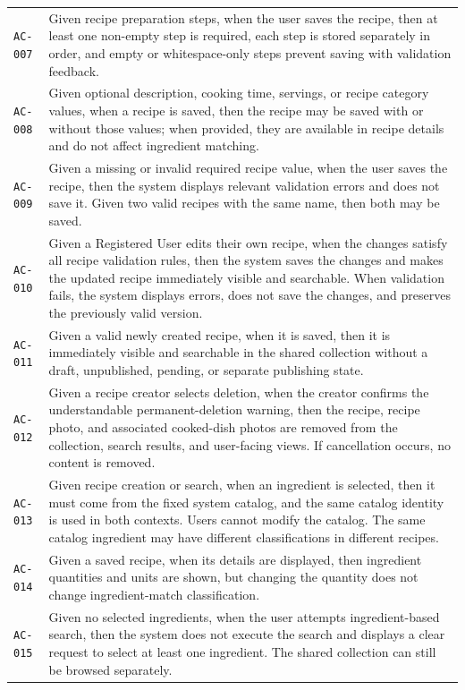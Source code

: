\documentclass[12pt]{article}
\begin{document}
\begin{longtable}{p{} p{}}
\texttt{AC-007} & Given recipe preparation steps, when the user saves the recipe, then at least one non-empty step is required, each step is stored separately in order, and empty or whitespace-only steps prevent saving with validation feedback. \\
\texttt{AC-008} & Given optional description, cooking time, servings, or recipe category values, when a recipe is saved, then the recipe may be saved with or without those values; when provided, they are available in recipe details and do not affect ingredient matching. \\
\texttt{AC-009} & Given a missing or invalid required recipe value, when the user saves the recipe, then the system displays relevant validation errors and does not save it. Given two valid recipes with the same name, then both may be saved. \\
\texttt{AC-010} & Given a Registered User edits their own recipe, when the changes satisfy all recipe validation rules, then the system saves the changes and makes the updated recipe immediately visible and searchable. When validation fails, the system displays errors, does not save the changes, and preserves the previously valid version. \\
\texttt{AC-011} & Given a valid newly created recipe, when it is saved, then it is immediately visible and searchable in the shared collection without a draft, unpublished, pending, or separate publishing state. \\
\texttt{AC-012} & Given a recipe creator selects deletion, when the creator confirms the understandable permanent-deletion warning, then the recipe, recipe photo, and associated cooked-dish photos are removed from the collection, search results, and user-facing views. If cancellation occurs, no content is removed. \\
\texttt{AC-013} & Given recipe creation or search, when an ingredient is selected, then it must come from the fixed system catalog, and the same catalog identity is used in both contexts. Users cannot modify the catalog. The same catalog ingredient may have different classifications in different recipes. \\
\texttt{AC-014} & Given a saved recipe, when its details are displayed, then ingredient quantities and units are shown, but changing the quantity does not change ingredient-match classification. \\
\texttt{AC-015} & Given no selected ingredients, when the user attempts ingredient-based search, then the system does not execute the search and displays a clear request to select at least one ingredient. The shared collection can still be browsed separately. \\

\end{longtable}
\end{document}
